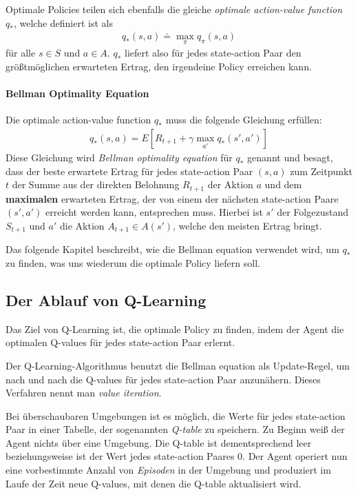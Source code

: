 Optimale Policies teilen sich ebenfalls die gleiche \textit{optimale action-value function} $ q_* $, welche definiert ist als
\begin{align}
    q_*(s, a) \doteq \max_\pi q_\pi(s, a)
\end{align}
für alle $ s \in S $ und $ a \in A $. $ q_* $ liefert also für jedes state-action Paar den größtmöglichen erwarteten Ertrag, den irgendeine Policy erreichen kann.

\paragraph{Bellman Optimality Equation}
Die optimale action-value function $ q_* $ muss die folgende Gleichung erfüllen:
\begin{align}
    q_*(s, a) = E \left[R_{t + 1} + \gamma \max_{a'} q_*(s', a') \right] \label{eq:bellman}
\end{align}
Diese Gleichung wird \textit{Bellman optimality equation} für $ q_* $ genannt und besagt, dass der beste erwartete Ertrag für jedes state-action Paar $ (s, a) $ zum Zeitpunkt $ t $ der Summe aus der direkten Belohnung $ R_{t + 1} $ der Aktion $ a $ und dem \textbf{maximalen} erwarteten Ertrag, der von einem der nächsten state-action Paare $ (s', a') $ erreicht werden kann, entsprechen muss. Hierbei ist $ s' $ der Folgezustand $ S_{t + 1} $ und $ a' $ die Aktion $ A_{t + 1} \in A(s') $, welche den meisten Ertrag bringt.

Das folgende Kapitel beschreibt, wie die Bellman equation verwendet wird, um $ q_* $ zu finden, was uns wiederum die optimale Policy liefern soll. 

\subsection{Der Ablauf von Q-Learning} \label{sec:q_learning_process}
Das Ziel von Q-Learning ist, die optimale Policy zu finden, indem der Agent die optimalen Q-values für jedes state-action Paar erlernt.

Der Q-Learning-Algorithmus benutzt die Bellman equation als Update-Regel, um nach und nach die Q-values für jedes state-action Paar anzunähern. Dieses Verfahren nennt man \textit{value iteration}.

Bei überschaubaren Umgebungen ist es möglich, die Werte für jedes state-action Paar in einer Tabelle, der sogenannten \textit{Q-table} zu speichern. Zu Beginn weiß der Agent nichts über eine Umgebung. Die Q-table ist dementsprechend leer beziehungsweise ist der Wert jedes state-action Paares 0. Der Agent operiert nun eine vorbestimmte Anzahl von \textit{Episoden} in der Umgebung und produziert im Laufe der Zeit neue Q-values, mit denen die Q-table aktualisiert wird.

